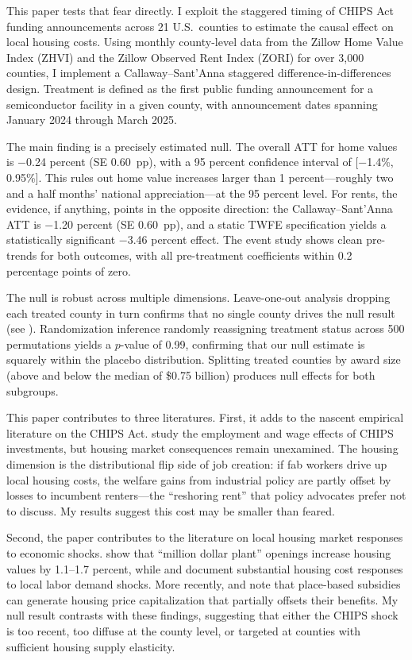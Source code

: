 \documentclass[12pt]{article}
\begin{document}
This paper tests that fear directly. I exploit the staggered timing of CHIPS Act funding announcements across 21 U.S.\ counties to estimate the causal effect on local housing costs. Using monthly county-level data from the Zillow Home Value Index (ZHVI) and the Zillow Observed Rent Index (ZORI) for over 3,000 counties, I implement a Callaway--Sant'Anna \citeyearpar{callaway2021difference} staggered difference-in-differences design. Treatment is defined as the first public funding announcement for a semiconductor facility in a given county, with announcement dates spanning January 2024 through March 2025.

The main finding is a precisely estimated null. The overall ATT for home values is $-$0.24 percent (SE 0.60~pp), with a 95 percent confidence interval of [$-$1.4\%, 0.95\%]. This rules out home value increases larger than 1 percent---roughly two and a half months' national appreciation---at the 95 percent level. For rents, the evidence, if anything, points in the opposite direction: the Callaway--Sant'Anna ATT is $-$1.20 percent (SE 0.60~pp), and a static TWFE specification yields a statistically significant $-$3.46 percent effect. The event study shows clean pre-trends for both outcomes, with all pre-treatment coefficients within 0.2 percentage points of zero.

The null is robust across multiple dimensions. Leave-one-out analysis dropping each treated county in turn confirms that no single county drives the null result (see ). Randomization inference randomly reassigning treatment status across 500 permutations yields a $p$-value of 0.99, confirming that our null estimate is squarely within the placebo distribution. Splitting treated counties by award size (above and below the median of \$0.75 billion) produces null effects for both subgroups.

This paper contributes to three literatures. First, it adds to the nascent empirical literature on the CHIPS Act. \citet{erten2025chips} study the employment and wage effects of CHIPS investments, but housing market consequences remain unexamined. The housing dimension is the distributional flip side of job creation: if fab workers drive up local housing costs, the welfare gains from industrial policy are partly offset by losses to incumbent renters---the ``reshoring rent'' that policy advocates prefer not to discuss. My results suggest this cost may be smaller than feared.

Second, the paper contributes to the literature on local housing market responses to economic shocks. \citet{greenstone2010identifying} show that ``million dollar plant'' openings increase housing values by 1.1--1.7 percent, while \citet{diamond2019housing} and \citet{ganong2023housing} document substantial housing cost responses to local labor demand shocks. More recently, \citet{bartik2019should} and \citet{slattery2020evaluating} note that place-based subsidies can generate housing price capitalization that partially offsets their benefits. My null result contrasts with these findings, suggesting that either the CHIPS shock is too recent, too diffuse at the county level, or targeted at counties with sufficient housing supply elasticity.
\end{document}
